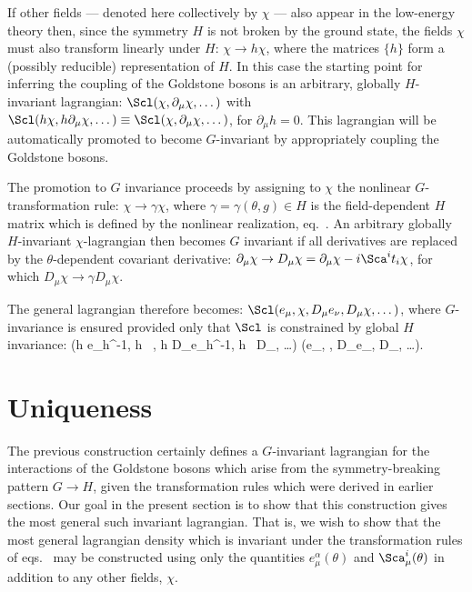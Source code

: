 \documentclass[12pt]{report}
\begin{document}
If other fields --- denoted here collectively by $\chi$ ---
also appear in the low-energy theory then, since the
symmetry $H$ is not broken by the ground state, the fields
$\chi$ must also transform linearly under $H$: $\chi \to h
\chi$, where the matrices $\{ h \}$ form a (possibly
reducible) representation of $H$. In this case the starting
point for inferring the coupling of the Goldstone bosons is
an arbitrary, globally $H$-invariant lagrangian: 
$\Scl(\chi, \partial_\mu \chi, \dots)$ with $ \Scl(h \chi,
h 
\partial_\mu \chi, \dots) \equiv \Scl(\chi, \partial_\mu
\chi, \dots)$, for $\partial_\mu h = 0$. This lagrangian
will be automatically promoted to become $G$-invariant by
appropriately coupling the Goldstone bosons.

The promotion to $G$ invariance proceeds by assigning to
$\chi$ the nonlinear $G$-transformation rule: $\chi \to
\gamma \chi$, where $\gamma = \gamma(\theta,g) \in H$ is
the field-dependent $H$ matrix which is defined by the
nonlinear realization, 
eq.~. An arbitrary globally
$H$-invariant 
$\chi$-lagrangian then becomes $G$ invariant if all
derivatives are replaced by the $\theta$-dependent
covariant derivative: 
$\partial_\mu \chi \to D_\mu \chi = \partial_\mu \chi - i
\Sca^i 
t_i \chi$, for which $D_\mu \chi \to \gamma D_\mu \chi$.

The general lagrangian therefore becomes: $\Scl(e_\mu,
\chi, 
D_\mu e_\nu, D_\mu \chi, \dots)$, where $G$-invariance is
ensured provided only that $\Scl$ is constrained by global
$H$ invariance:
%
\eq
\label{genlagrinvc}
\Scl(h e_\mu h^{-1}, h \, \chi, h D_\mu e_\nu h^{-1}, h \,
D_\mu \chi, \dots)
\equiv \Scl(e_\mu, \chi, D_\mu e_\nu, D_\mu \chi, \dots).
\eeq

\section{Uniqueness}

The previous construction certainly defines a $G$-invariant
lagrangian for the interactions of the Goldstone bosons
which arise from the symmetry-breaking pattern $G \to H$,
given the transformation rules which were derived in
earlier sections. Our goal in the present section is to
show that this construction gives the most general such
invariant lagrangian. That is, we wish to show that the
most general lagrangian density which is invariant under
the transformation rules of eqs.~ may
be constructed using only the quantities
$e^\alpha_\mu(\theta)$ and $\Sca^i_\mu(\theta)$ in addition
to any other fields, $\chi$.
\end{document}
